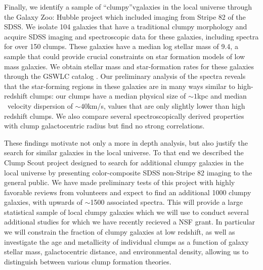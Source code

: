 Finally, we identify a sample of ``clumpy''vgalaxies in the local universe through the Galaxy Zoo: Hubble project which included imaging from Stripe 82 of the SDSS. We isolate 104 galaxies that have a traditional clumpy morphology and acquire SDSS imaging and spectroscopic data for these galaxies, including spectra for over 150 clumps. These galaxies have a median log stellar mass of 9.4, a sample that could provide crucial constraints on star formation models of low mass galaxies. We obtain stellar mass and star-formation rates for these galaxies through the GSWLC catalog \citep{Salim2016}. Our preliminary analysis of the spectra reveals that the star-forming regions in these galaxies are in many ways similar to high-redshift clumps: our clumps have a median physical size of $\sim1$kpc and median \ha~velocity dispersion of $\sim40$km/s, values that are only slightly lower than high redshift clumps. We also compare several spectroscopically derived properties with clump galactocentric radius but find no strong correlations.

These findings motivate not only a more in depth analysis, but also justify the search for similar galaxies in the local universe. To that end we described the Clump Scout project designed to search for additional clumpy galaxies in the local universe by presenting color-composite SDSS non-Stripe 82 imaging to the general public. We have made preliminary tests of this project with highly favorable reviews from volunteers and expect to find an additional 1000 clumpy galaxies, with upwards of $\sim$1500 associated spectra. This will provide a large statistical sample of local clumpy galaxies which we will use to conduct several additional studies for which we have recently recieved a NSF grant. In particular we will constrain the fraction of clumpy galaxies at low redshift, as well as investigate the age and metallicity of individual clumps as a function of galaxy stellar mass, galactocentric distance, and environmental density, allowing us to distinguish  between various clump formation theories.



